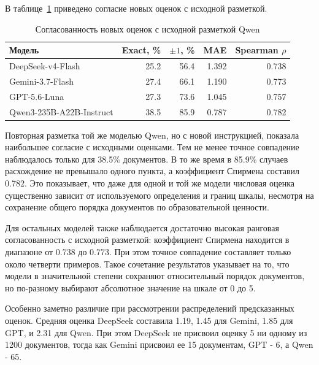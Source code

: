 \documentclass[12pt,a4paper]{article}
\begin{document}
В таблице~\ref{tab:edu-old-comparison} приведено согласие новых оценок 
с исходной разметкой.

\begin{table}[ht]
\centering
\small
\caption{Согласованность новых оценок с исходной разметкой Qwen}
\label{tab:edu-old-comparison}
\begin{tabular}{lrrrr}
\toprule
Модель &
Exact, \% &
$\pm 1$, \% &
MAE &
Spearman $\rho$ \\
\midrule
DeepSeek-v4-Flash &
25.2 & 56.4 & 1.392 & 0.738 \\

Gemini-3.7-Flash &
27.4 & 66.1 & 1.190 & 0.773 \\

GPT-5.6-Luna &
27.3 & 73.6 & 1.045 & 0.757 \\

Qwen3-235B-A22B-Instruct &
38.5 & 85.9 & 0.787 & 0.782 \\
\bottomrule
\end{tabular}
\end{table}

Повторная разметка той же моделью Qwen, но с новой инструкцией, показала наибольшее 
согласие с исходными оценками. Тем не менее точное совпадение наблюдалось только 
для 38.5\% документов. В то же время в 85.9\% случаев расхождение не превышало одного 
пункта, а коэффициент Спирмена составил 0.782. Это показывает, что даже для одной 
и той же модели числовая оценка существенно зависит от используемого определения 
и границ шкалы, несмотря на сохранение общего порядка документов по образовательной ценности.

Для остальных моделей также наблюдается достаточно высокая ранговая согласованность 
с исходной разметкой: коэффициент Спирмена находится в диапазоне от 0.738 до 0.773.
При этом точное совпадение составляет только около четверти примеров.
Такое сочетание результатов указывает на то, что модели в значительной степени 
сохраняют относительный порядок документов, но по-разному выбирают абсолютное 
значение на шкале от 0 до 5.

Особенно заметно различие при рассмотрении распределений предсказанных оценок.
Средняя оценка DeepSeek составила 1.19, 
1.45 для Gemini, 1.85 для GPT, и 2.31 для Qwen.
При этом DeepSeek не присвоил оценку 5 ни одному из 1200 документов,
тогда как Gemini присвоил ее 15 документам, GPT - 6, а Qwen - 65.
\end{document}
